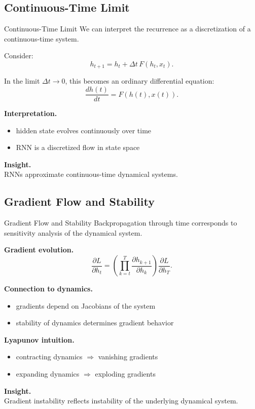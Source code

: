 \documentclass[aspectratio=169,11pt]{beamer}
\begin{document}
\subsection{Continuous-Time Limit}
\begin{frame}[t,allowframebreaks]{Continuous-Time Limit}
\small
We can interpret the recurrence as a discretization of a continuous-time system.

Consider:
\[
h_{t+1} = h_t + \Delta t \, F(h_t, x_t).
\]

In the limit $\Delta t \to 0$, this becomes an ordinary differential equation:
\[
\frac{dh(t)}{dt} = F(h(t), x(t)).
\]

\textbf{Interpretation.}\\ \begin{itemize}
    \item hidden state evolves continuously over time
    \item RNN is a discretized flow in state space
\end{itemize}

\textbf{Insight.}\\ RNNs approximate continuous-time dynamical systems.
\end{frame}

\subsection{Gradient Flow and Stability}
\begin{frame}[t,allowframebreaks]{Gradient Flow and Stability}
\small
Backpropagation through time corresponds to sensitivity analysis of the dynamical system.

\textbf{Gradient evolution.}\\ \[
\frac{\partial L}{\partial h_t}
= \left( \prod_{k=t}^{T} \frac{\partial h_{k+1}}{\partial h_k} \right)
\frac{\partial L}{\partial h_T}.
\]

\textbf{Connection to dynamics.}\\ \begin{itemize}
    \item gradients depend on Jacobians of the system
    \item stability of dynamics determines gradient behavior
\end{itemize}

\textbf{Lyapunov intuition.}\\ \begin{itemize}
    \item contracting dynamics $\Rightarrow$ vanishing gradients
    \item expanding dynamics $\Rightarrow$ exploding gradients
\end{itemize}

\textbf{Insight.}\\ Gradient instability reflects instability of the underlying dynamical system.
\end{frame}
\end{document}
